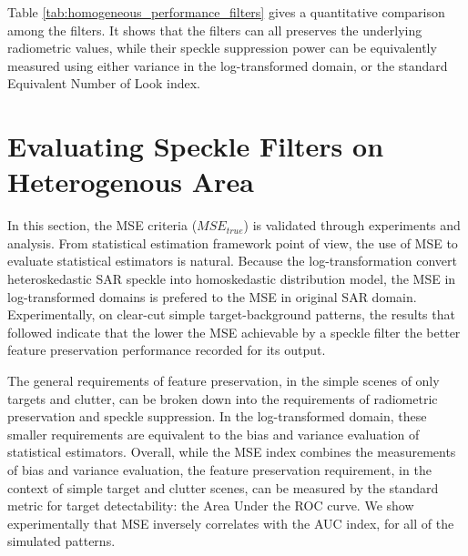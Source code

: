 \documentclass[journal]{IEEEtran}
\begin{document}
Table \ref{tab:homogeneous_performance_filters} gives a quantitative comparison among the filters.
It shows that the filters can all preserves the underlying radiometric values, while their speckle suppression power can be equivalently measured using either variance in the log-transformed domain, or the standard Equivalent Number of Look index.

\section{Evaluating Speckle Filters on Heterogenous Area}
\label{sec:eval_hetero}


In this section, the MSE criteria ($MSE_{true}$) is validated through experiments and analysis. 
From statistical estimation framework point of view, the use of MSE to evaluate statistical estimators is natural.
Because the log-transformation convert heteroskedastic SAR speckle into homoskedastic distribution model, 
	the MSE in log-transformed domains is prefered to the MSE in original SAR domain.
Experimentally, on clear-cut simple target-background patterns, the results that followed indicate that
	the lower the MSE achievable by a speckle filter
	the better feature preservation performance recorded for its output.

The general requirements of feature preservation, in the simple scenes of only targets and clutter, can be broken down into the requirements of radiometric preservation and speckle suppression.
In the log-transformed domain, these smaller requirements are equivalent to the bias and variance evaluation of statistical estimators.
Overall, while the MSE index combines the measurements of bias and variance evaluation, 
	the feature preservation requirement, in the context of simple target and clutter scenes, can be measured by the standard metric for target detectability: the Area Under the ROC curve.
We show experimentally that MSE inversely correlates with the AUC index, for all of the simulated patterns.
\end{document}
